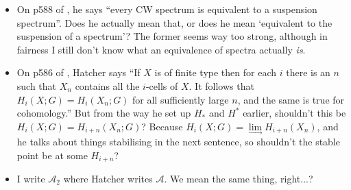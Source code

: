 \documentclass{MetricNotes2023}
\def\bb{\ensuremath\mathbb}
\def\subq{\ensuremath\subseteq}
\def\inte{\ensuremath\mathbb{Z}}
\def\A{\ensuremath{\mathscr{A}_2}}
\begin{document}
\begin{itemize}


\item On p588 of \autocite{hatcher5}, he says ``every CW spectrum is equivalent to a suspension spectrum''. Does he actually mean that, or does he mean `equivalent to the suspension of a spectrum'? The former seems way too strong, although in fairness I still don't know what an equivalence of spectra actually \textit{is}. 


\item On p586 of \autocite{hatcher5}, Hatcher says ``If \(X\) is of finite type then for each \(i\) there is an \(n\) such that \(X_n\) contains all the \(i\)-cells of \(X\). It follows that \(H_i(X;G)=H_i(X_n;G)\) for all sufficiently large \(n\), and the same is true for cohomology.'' But from the way he set up \(H_*\) and \(H^*\) earlier, shouldn't this be \(H_i(X;G)=H_{i+n}(X_n; G)\)? Because \(H_i(X;G)=\lim\limits_{\rightarrow}H_{i+n}(X_n)\), and he talks about things stabilising in the next sentence, so shouldn't the stable point be at some \(H_{i+n}\)?

\item I write \(\A\) where Hatcher writes \(\mathscr{A}\). We mean the same thing, right...?

\end{itemize}
\end{document}
